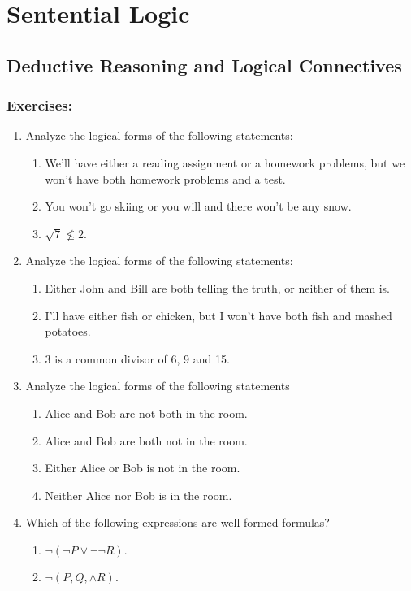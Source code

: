 \section{Sentential Logic}
\subsection{Deductive Reasoning and Logical Connectives}
\subsubsection{Exercises:}
\begin{enumerate}
\item Analyze the logical forms of the following statements:
  \begin{enumerate}
  \item We'll have either a reading assignment or a homework problems, but we won't have both homework problems and a test.
  \item You won't go skiing or you will and there won't be any snow.
  \item $\sqrt{7} \nleq 2$.
  \end{enumerate}
\item Analyze the logical forms of the following statements:
  \begin{enumerate}
  \item Either John and Bill are both telling the truth, or neither of them is.
  \item I'll have either fish or chicken, but I won't have both fish and mashed potatoes.
  \item 3 is a common divisor of 6, 9 and 15.
  \end{enumerate}
\item Analyze the logical forms of the following statements
  \begin{enumerate}
  \item Alice and Bob are not both in the room.
  \item Alice and Bob are both not in the room.
  \item Either Alice or Bob is not in the room.
  \item Neither Alice nor Bob is in the room.
  \end{enumerate}
\item Which of the following expressions are well-formed formulas?
  \begin{enumerate}
  \item $\neg(\neg P \lor \neg \neg R)$.
  \item $\neg(P, Q, \land R)$.

\end{enumerate}
\end{enumerate}
